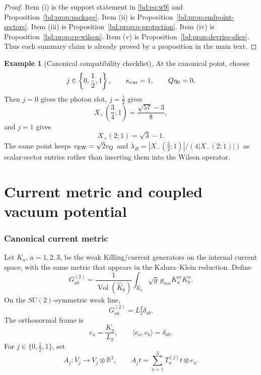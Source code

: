 \documentclass[11pt]{article}
\newcommand{\RR}{\mathbb{R}}
\newcommand{\Vol}{\operatorname{Vol}}
\theoremstyle{plain}
\theoremstyle{definition}
\newtheorem{example}[proposition]{Example}
\begin{document}
\begin{proof}
Item (i) is the support statement in \eqref{bd:eq:w9} and
Proposition~\ref{bd:prop:package}.  Item (ii) is
Proposition~\ref{bd:prop:endpoint-sectors}.  Item (iii) is
Proposition~\ref{bd:prop:q-protection}.  Item (iv) is
Proposition~\ref{bd:prop:cp-wilson}.  Item (v) is
Proposition~\ref{bd:prop:devries-slice}.  Thus each summary claim is already
proved by a proposition in the main text.
\end{proof}

\begin{example}[Canonical compatibility checklist]
\label{bd:ex:canonical-checklist}
At the canonical point, choose
\[
  j\in\left\{0,\frac12,1\right\},\qquad
  \kappa_{\rm cur}=1,\qquad
  Q\eta_0=0 .
\]
Then \(j=0\) gives the photon slot, \(j=\tfrac12\) gives
\[
  X_+\!\left(\frac34;1\right)=\frac{\sqrt{57}-3}{8},
\]
and \(j=1\) gives
\[
  X_+(2;1)=\sqrt3-1 .
\]
The same point keeps \(v_{\rm EW}=\sqrt2v_Q\) and
\(\lambda_H=|X_-(\frac34;1)|/(4|X_-(2;1)|)\) as scalar-sector entries rather
than inserting them into the Wilson operator.
\end{example}

\clearpage

\part{Current metric and coupled vacuum potential}
\setcounter{section}{0}
\renewcommand{\thesection}{\arabic{section}}

\section{Canonical current metric}
\label{new:sec:current-metric}

Let \(K_a\), \(a=1,2,3\), be the weak Killing/current generators on the internal
current space, with the same metric that appears in the Kaluza--Klein reduction.
Define
\begin{equation}
  G^{(2)}_{ab}
  =
  \frac{1}{\Vol(\widehat K_6)}
  \int_{\widehat K_6}\sqrt g\, g_{mn}K_a^mK_b^n .
  \label{new:eq:current-metric}
\end{equation}
On the \(SU(2)\)-symmetric weak line,
\begin{equation}
  G^{(2)}_{ab}=L_2^2\delta_{ab}.
  \label{new:eq:current-metric-line}
\end{equation}
The orthonormal frame is
\begin{equation}
  e_a=\frac{K_a}{L_2},\qquad \langle e_a,e_b\rangle=\delta_{ab}.
  \label{new:eq:orthonormal-current-frame}
\end{equation}
For \(j\in\{0,\frac12,1\}\), set
\begin{equation}
  A_j:V_j\longrightarrow V_j\otimes\RR^3,
  \qquad
  A_jt=\sum_{a=1}^3T_a^{(j)}t\otimes e_a .
  \label{new:eq:aj}
\end{equation}
\end{document}
